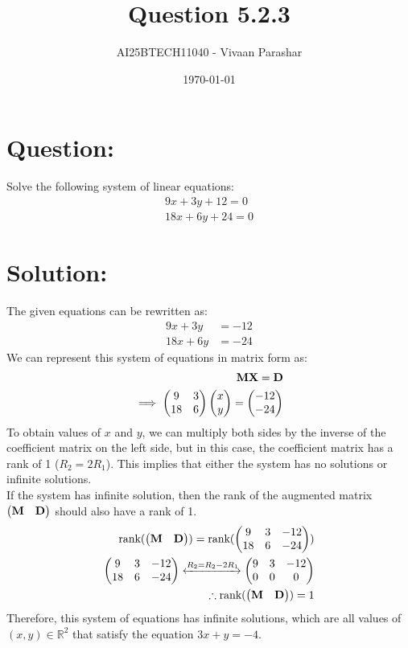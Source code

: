 \documentclass[a4paper, 12pt]{article}
\title{Question 5.2.3}
\author{AI25BTECH11040 - Vivaan Parashar}
\date{\today}
\begin{document}
\maketitle

\section{Question: }
Solve the following system of linear equations:
\begin{align*}
    9x + 3y + 12 = 0\\
    18x + 6y + 24 = 0
\end{align*}

\section{Solution: }
The given equations can be rewritten as:
\begin{align}
    9x + 3y &= -12 \\
    18x + 6y &= -24
\end{align}
We can represent this system of equations in matrix form as:
\begin{align}
    \mathbf{M}\mathbf{X} = \mathbf{D}\\
    \implies \begin{pmatrix}9 & 3 \\ 18 & 6\end{pmatrix} \begin{pmatrix}x \\ y\end{pmatrix} = \begin{pmatrix}-12 \\ -24\end{pmatrix}
\end{align}
To obtain values of $x$ and $y$, we can multiply both sides by the inverse of the coefficient matrix on the left side, but in this case, the coefficient matrix has a rank of 1 ($R_2 = 2R_1$). This implies that either the system has no solutions or infinite solutions.\\
If the system has infinite solution, then the rank of the augmented matrix $\begin{pmatrix}\mathbf{M} & \mathbf{D}\end{pmatrix}$ should also have a rank of 1.
\begin{align}
    \text{rank}(\begin{pmatrix}\mathbf{M} & \mathbf{D}\end{pmatrix}) = \text{rank}(\begin{pmatrix}9 & 3 & -12 \\ 18 & 6 & -24\end{pmatrix})\\
    \begin{pmatrix}9 & 3 & -12 \\ 18 & 6 & -24\end{pmatrix} \xleftrightarrow{R_2 = R_2 - 2R_1} \begin{pmatrix}9 & 3 & -12 \\ 0 & 0 & 0\end{pmatrix}\\
    \therefore \text{rank}(\begin{pmatrix}\mathbf{M} & \mathbf{D}\end{pmatrix}) = 1
\end{align}
Therefore, this system of equations has infinite solutions, which are all values of $(x, y) \in \mathbb{R}^2$ that satisfy the equation $3x + y = -4$.\\
\end{document}
